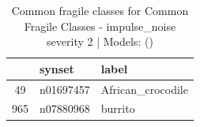 \begin{table}
\caption{Common fragile classes for Common Fragile Classes - impulse_noise severity 2 | Models: ()}
\label{tab:Common Fragile Classes - impulse_noise severity 2_d41d8cd9}
\begin{tabular}{cll}
\toprule
 & synset & label \\
\midrule
49 & n01697457 & African_crocodile \\
965 & n07880968 & burrito \\
\bottomrule
\end{tabular}
\end{table}

